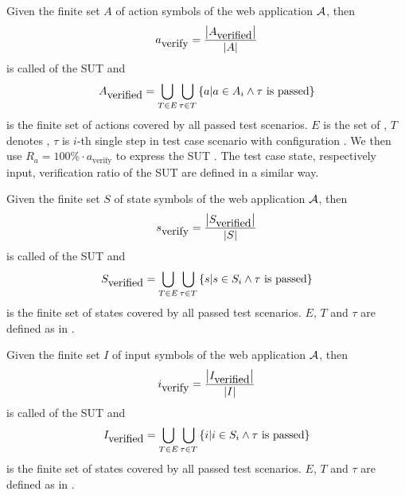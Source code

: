 \begin{defi}
Given the finite set $A$ of action symbols of the web application $\mathcal{A}$, then
\begin{equation}
a_{\mbox{verify}}=\displaystyle\frac{\left|A_{\mbox{verified}}\right|}{\left|A\right|}
\end{equation}
is called  of the SUT and
\begin{equation}
A_{\mbox{verified}}=\displaystyle\bigcup_{T\in E}\displaystyle\bigcup_{\tau\in T}\left\{ a|a\in A_i\wedge \tau\mbox{ is passed}\right\}
\end{equation}
is the finite set of actions covered by all passed test scenarios. $E$ is the set of , $T$ denotes , $τ$ is $i$-th single step in test case scenario
with configuration . We then use $R_a = 100\%\cdot a_{\mbox{verify}}$ to express the SUT . The test case state, respectively input, verification ratio of the SUT are defined in a similar way.
\cite{conf/fedcsis/FrajtakBJ12}
\end{defi}

\begin{defi}
Given the finite set $S$ of state symbols of the web application $\mathcal{A}$, then
\begin{equation}
s_{\mbox{verify}}=\displaystyle\frac{\left|S_{\mbox{verified}}\right|}{\left|S\right|}
\end{equation}
is called  of the SUT and
\begin{equation}
S_{\mbox{verified}}=\displaystyle\bigcup_{T\in E}\displaystyle\bigcup_{\tau\in T}\left\{ s|s\in S_i\wedge \tau\mbox{ is passed}\right\}
\end{equation}
is the finite set of states covered by all passed test scenarios. $E$, $T$ and $\tau$ are defined as in .
\cite{conf/fedcsis/FrajtakBJ12}
\end{defi}

\begin{defi}
Given the finite set $I$ of input symbols of the web application $\mathcal{A}$, then
\begin{equation}
i_{\mbox{verify}}=\displaystyle\frac{\left|I_{\mbox{verified}}\right|}{\left|I\right|}
\end{equation}
is called  of the SUT and
\begin{equation}
I_{\mbox{verified}}=\displaystyle\bigcup_{T\in E}\displaystyle\bigcup_{\tau\in T}\left\{ i|i\in S_i\wedge \tau\mbox{ is passed}\right\}
\end{equation}
is the finite set of states covered by all passed test scenarios. $E$, $T$ and $\tau$ are defined as in .
\cite{conf/fedcsis/FrajtakBJ12}
\end{defi}